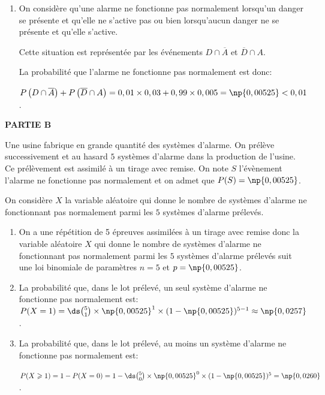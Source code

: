 \begin{enumerate}
\item On considère qu'une alarme ne fonctionne pas normalement lorsqu'un danger se présente et qu'elle ne s'active pas ou bien lorsqu'aucun danger ne se présente et qu'elle s'active.

Cette situation est représentée par les événements $D\cap \overline{A}$ et $\overline{D}\cap A$.

La probabilité que l'alarme ne fonctionne pas normalement est donc:%

$P\left (D\cap \overline{A}\right )+ P\left (\overline{D}\cap A\right )
=  0,01\times 0,03 + 0,99\times 0,005 = \np{0,00525} < 0,01$.

\end{enumerate}

\medskip

\textbf{PARTIE B}

\medskip

Une usine fabrique en grande quantité des systèmes d'alarme. On prélève successivement et au hasard $5$ systèmes d'alarme dans la production de l'usine. Ce prélèvement est assimilé à un tirage avec remise.
On note $S$ l'évènement \og  l'alarme ne fonctionne pas normalement \fg{}  et on admet que $P(S) = \np{0,00525}$.

On considère $X$ la variable aléatoire qui donne le nombre de systèmes d'alarme ne fonctionnant pas normalement parmi les $5$ systèmes d'alarme prélevés.

%

\begin{enumerate}
\item On a une répétition de 5 épreuves  assimilées à un tirage avec remise donc  la variable aléatoire $X$ qui donne le nombre de systèmes d'alarme ne fonctionnant pas normalement parmi les $5$ systèmes d'alarme prélevés suit une loi binomiale de paramètres $n=5$ et $p=\np{0,00525}$.


\item La probabilité que, dans le lot prélevé, un seul système d'alarme ne fonctionne pas normalement est:
$P(X=1) = \ds\binom{5}{1} \times \np{0,00525}^1 \times (1-\np{0,00525})^{5-1}
\approx \np{0,0257}$.

\item La probabilité que, dans le lot prélevé, au moins un système d'alarme ne fonctionne pas normalement est:

$P(X\geqslant 1) = 1-P(X=0) = 1- \ds\binom{5}{0} \times \np{0,00525}^0 \times (1-\np{0,00525})^5 = \np{0,0260}$.

\end{enumerate}


